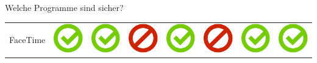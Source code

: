 \documentclass[final]{beamer}
\newlength{\twocolwid}
\begin{document}
\begin{frame}[t]
\begin{columns}[t, totalwidth=\textwidth]
\begin{column}{\twocolwid}
\begin{block}{Welche Programme sind sicher?}
\begin{tabular}{ l | C{4cm} | C{4.5cm} | C{4cm} | C{4.5cm} | C{4cm} | C{5cm} | C{3cm} | }
FaceTime & \includegraphics[scale=0.5]{pics/haken.png} & \includegraphics[scale=0.5]{pics/haken.png} & \includegraphics[scale=0.5]{pics/nohaken.png} & \includegraphics[scale=0.5]{pics/haken.png} & \includegraphics[scale=0.5]{pics/nohaken.png} & \includegraphics[scale=0.5]{pics/haken.png} & \includegraphics[scale=0.5]{pics/haken.png} \tabularnewline

\end{tabular}
\end{block}
\end{column}
\end{columns}
\end{frame}
\end{document}
